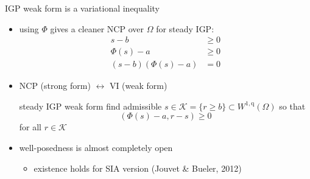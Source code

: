 \documentclass[usepdftitle=false,usenames,dvipsnames]{beamer}
\newcommand{\ip}[2]{\left(#1,#2\right)}
\newcommand{\qq}{{\text{q}}}
\begin{document}
\begin{frame}{IGP weak form is a variational inequality}

\begin{itemize}
\item using $\Phi$ gives a cleaner NCP over $\Omega$ for steady IGP:
\begin{align*}
s - b &\ge 0 \\
\Phi(s) - a &\ge 0 \\
(s - b) (\Phi(s) - a) &= 0
\end{align*}

\item NCP (strong form) $\leftrightarrow$ VI (weak form)

\begin{block}{steady IGP weak form}
find admissible $s \in \mathcal{K} = \{r \ge b\} \subset W^{1,\qq}(\Omega)$ so that
    $$\ip{\Phi(s)-a}{r-s} \ge 0$$
for all $r \in \mathcal{K}$
\end{block}

\item well-posedness is almost completely open
    \begin{itemize}
    \item existence holds for SIA version (Jouvet \& Bueler, 2012)
    \end{itemize}

\end{itemize}
\end{frame}
\end{document}
